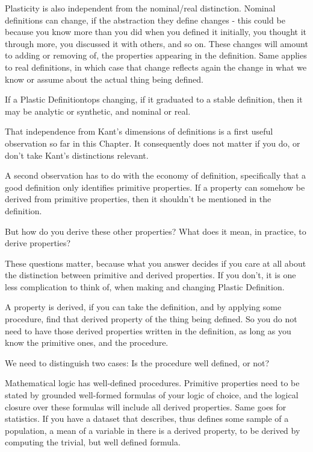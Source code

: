 \documentclass[graybox,envcountchap,sectrefs]{svmono}
\newcommand{\newdef}[1]{Plastic Definition}
\begin{document}
Plasticity is also independent from the nominal/real distinction. Nominal definitions can change, if the abstraction they define changes - this could be because you know more than you did when you defined it initially, you thought it through more, you discussed it with others, and so on. These changes will amount to adding or removing of, the properties appearing in the definition. Same applies to real definitions, in which case that change reflects again the change in what we know or assume about the actual thing being defined.

If a \newdef stops changing, if it graduated to a stable definition, then it may be analytic or synthetic, and nominal or real. 

That independence from Kant's dimensions of definitions is a first useful observation so far in this Chapter. It consequently does not matter if you do, or don't take Kant's distinctions relevant. 

A second observation has to do with the economy of definition, specifically that a good definition only identifies primitive properties. If a property can somehow be derived from primitive properties, then it shouldn't be mentioned in the definition. 

But how do you derive these other properties? What does it mean, in practice, to derive properties? 

These questions matter, because what you answer decides if you care at all about the distinction between primitive and derived properties. If you don't, it is one less complication to think of, when making and changing \newdef s.

A property is derived, if you can take the definition, and by applying some procedure, find that derived property of the thing being defined. So you do not need to have those derived properties written in the definition, as long as you know the primitive ones, and the procedure.

We need to distinguish two cases: Is the procedure well defined, or not? 

Mathematical logic has well-defined procedures. Primitive properties need to be stated by grounded well-formed formulas of your logic of choice, and the logical closure over these formulas will include all derived properties. Same goes for statistics. If you have a dataset that describes, thus defines some sample of a population, a mean of a variable in there is a derived property, to be derived by computing the trivial, but well defined formula. 
\end{document}
